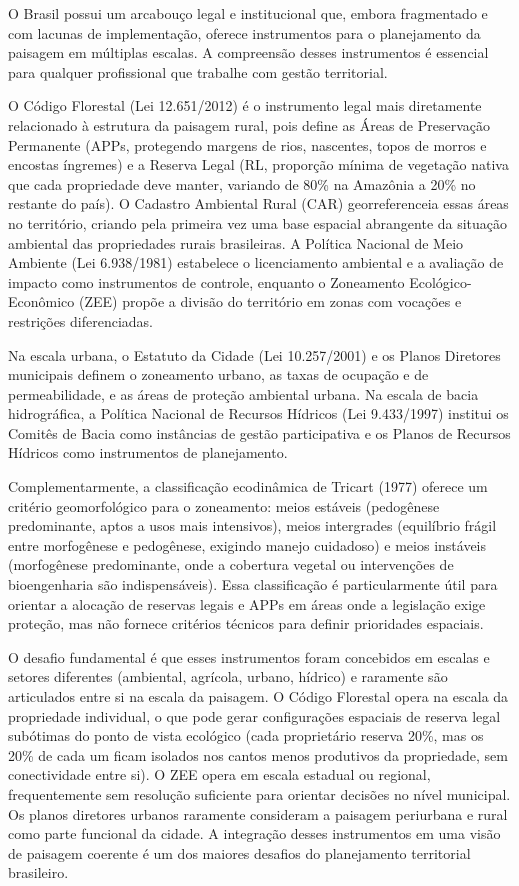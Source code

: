 \documentclass[
  portuguese,
  11pt,
  a4paper,
  open=any]{scrbook}
\begin{document}
O Brasil possui um arcabouço legal e institucional que, embora
fragmentado e com lacunas de implementação, oferece instrumentos para o
planejamento da paisagem em múltiplas escalas. A compreensão desses
instrumentos é essencial para qualquer profissional que trabalhe com
gestão territorial.

O Código Florestal (Lei 12.651/2012) é o instrumento legal mais
diretamente relacionado à estrutura da paisagem rural, pois define as
Áreas de Preservação Permanente (APPs, protegendo margens de rios,
nascentes, topos de morros e encostas íngremes) e a Reserva Legal (RL,
proporção mínima de vegetação nativa que cada propriedade deve manter,
variando de 80\% na Amazônia a 20\% no restante do país). O Cadastro
Ambiental Rural (CAR) georreferenceia essas áreas no território, criando
pela primeira vez uma base espacial abrangente da situação ambiental das
propriedades rurais brasileiras. A Política Nacional de Meio Ambiente
(Lei 6.938/1981) estabelece o licenciamento ambiental e a avaliação de
impacto como instrumentos de controle, enquanto o Zoneamento
Ecológico-Econômico (ZEE) propõe a divisão do território em zonas com
vocações e restrições diferenciadas.

Na escala urbana, o Estatuto da Cidade (Lei 10.257/2001) e os Planos
Diretores municipais definem o zoneamento urbano, as taxas de ocupação e
de permeabilidade, e as áreas de proteção ambiental urbana. Na escala de
bacia hidrográfica, a Política Nacional de Recursos Hídricos (Lei
9.433/1997) institui os Comitês de Bacia como instâncias de gestão
participativa e os Planos de Recursos Hídricos como instrumentos de
planejamento.

Complementarmente, a classificação ecodinâmica de Tricart (1977) oferece
um critério geomorfológico para o zoneamento: meios estáveis (pedogênese
predominante, aptos a usos mais intensivos), meios intergrades
(equilíbrio frágil entre morfogênese e pedogênese, exigindo manejo
cuidadoso) e meios instáveis (morfogênese predominante, onde a cobertura
vegetal ou intervenções de bioengenharia são indispensáveis). Essa
classificação é particularmente útil para orientar a alocação de
reservas legais e APPs em áreas onde a legislação exige proteção, mas
não fornece critérios técnicos para definir prioridades espaciais.

O desafio fundamental é que esses instrumentos foram concebidos em
escalas e setores diferentes (ambiental, agrícola, urbano, hídrico) e
raramente são articulados entre si na escala da paisagem. O Código
Florestal opera na escala da propriedade individual, o que pode gerar
configurações espaciais de reserva legal subótimas do ponto de vista
ecológico (cada proprietário reserva 20\%, mas os 20\% de cada um ficam
isolados nos cantos menos produtivos da propriedade, sem conectividade
entre si). O ZEE opera em escala estadual ou regional, frequentemente
sem resolução suficiente para orientar decisões no nível municipal. Os
planos diretores urbanos raramente consideram a paisagem periurbana e
rural como parte funcional da cidade. A integração desses instrumentos
em uma visão de paisagem coerente é um dos maiores desafios do
planejamento territorial brasileiro.
\end{document}
